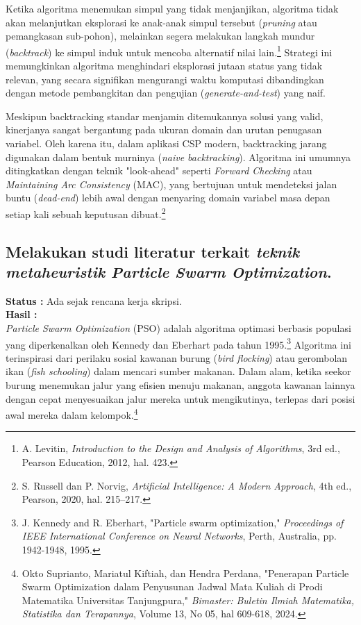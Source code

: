 \documentclass[a4paper,twoside]{article}
\begin{document}
	Ketika algoritma menemukan simpul yang tidak menjanjikan, algoritma tidak akan melanjutkan eksplorasi ke anak-anak simpul tersebut (\textit{pruning} atau pemangkasan sub-pohon), melainkan segera melakukan langkah mundur (\textit{backtrack}) ke simpul induk untuk mencoba alternatif nilai lain.\footnote{A. Levitin, \textit{Introduction to the Design and Analysis of Algorithms}, 3rd ed., Pearson Education, 2012, hal. 423.} Strategi ini memungkinkan algoritma menghindari eksplorasi jutaan status yang tidak relevan, yang secara signifikan mengurangi waktu komputasi dibandingkan dengan metode pembangkitan dan pengujian (\textit{generate-and-test}) yang naif.
	
	Meskipun backtracking standar menjamin ditemukannya solusi yang valid, kinerjanya sangat bergantung pada ukuran domain dan urutan penugasan variabel. Oleh karena itu, dalam aplikasi CSP modern, backtracking jarang digunakan dalam bentuk murninya (\textit{naive backtracking}). Algoritma ini umumnya ditingkatkan dengan teknik "look-ahead" seperti \textit{Forward Checking} atau \textit{Maintaining Arc Consistency} (MAC), yang bertujuan untuk mendeteksi jalan buntu (\textit{dead-end}) lebih awal dengan menyaring domain variabel masa depan setiap kali sebuah keputusan dibuat.\footnote{S. Russell dan P. Norvig, \textit{Artificial Intelligence: A Modern Approach}, 4th ed., Pearson, 2020, hal. 215--217.}
	
	\subsection{Melakukan studi literatur terkait \textit{teknik metaheuristik Particle Swarm Optimization}.}
	{\bf Status :} Ada sejak rencana kerja skripsi.\\
	{\bf Hasil :}\\
	\textit{Particle Swarm Optimization} (PSO) adalah algoritma optimasi berbasis populasi yang diperkenalkan oleh Kennedy dan Eberhart pada tahun 1995.\footnote{J. Kennedy and R. Eberhart, "Particle swarm optimization," \textit{Proceedings of IEEE International Conference on Neural Networks}, Perth, Australia, pp. 1942-1948, 1995.} Algoritma ini terinspirasi dari perilaku sosial kawanan burung (\textit{bird flocking}) atau gerombolan ikan (\textit{fish schooling}) dalam mencari sumber makanan. Dalam alam, ketika seekor burung menemukan jalur yang efisien menuju makanan, anggota kawanan lainnya dengan cepat menyesuaikan jalur mereka untuk mengikutinya, terlepas dari posisi awal mereka dalam kelompok.\footnote{Okto Suprianto, Mariatul Kiftiah, dan Hendra Perdana, "Penerapan Particle Swarm Optimization dalam Penyusunan Jadwal Mata Kuliah di Prodi Matematika Universitas Tanjungpura," \textit{Bimaster: Buletin Ilmiah Matematika, Statistika dan Terapannya}, Volume 13, No 05, hal 609-618, 2024.}
	
\end{document}
